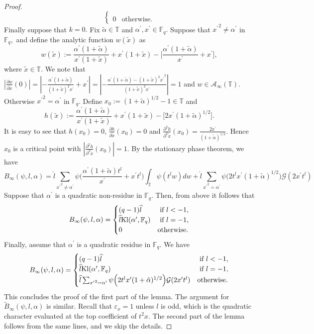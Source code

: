 \documentclass[11pt]{amsart}
\theoremstyle{plain}
\theoremstyle{plain}
\theoremstyle{remark}
\theoremstyle{definition}
\newcommand{\hl}{\widehat l}
\newcommand{\Kl}{\textup{Kl}}
\newcommand{\FF}{\mathbb{F}}
\newcommand{\TT}{\mathbb{T}}
\newcommand{\cA}{\mathcal{A}}
\newcommand{\cG}{\mathcal{G}}
\begin{document}
\begin{proof}
\[\begin{cases}
\\
0   &\text{otherwise.} \end{cases}
\]
Finally suppose that $k=0.$ Fix $\tilde{\alpha}\in \TT $ and $\alpha^{\prime}, x^{\prime} \in \FF_q.$ Suppose that ${x^{\prime}}^2\neq \alpha^{\prime}$ in $\FF_q,$  and  define the analytic function $w(\tilde{x})$ as 
\[
w(\tilde{x}):=\frac{ \alpha^{\prime} (1+\tilde{\alpha})}{x^{\prime}(1+\tilde{x})} + x^{\prime}(1+\tilde{x})- \big[   \frac{ \alpha^{\prime} (1+\tilde{\alpha})}{x^{\prime}} +x^{\prime} \big], 
\]
where $\tilde{x}\in\TT.$ We note that 
$|\frac{\partial w}{\partial \tilde{x}}(0)|=|-\frac{ \alpha^{\prime} (1+\tilde{\alpha})}{(1+\tilde{x})^2x^{\prime}} + x^{\prime}|=|-\frac{ \alpha^{\prime} (1+\tilde{\alpha})-{(1+\tilde{x})^2x^{\prime}}^2}{(1+\tilde{x})^2x^{\prime}} |=1$ and    $w\in \cA_{\infty}(\TT).$ Otherwise ${x^{\prime}}^2= \alpha^{\prime}$ in $\FF_q$. Define $x_0:=(1+\tilde{\alpha})^{1/2}-1\in\TT$ and 
\[
h(\tilde{x}):=\frac{ \alpha^{\prime} (1+\tilde{\alpha})}{x^{\prime}(1+\tilde{x})} + x^{\prime}(1+\tilde{x})- \big[ 2x^{\prime}(1+\tilde{\alpha})^{1/2} \big].
\]
It is easy to see that $h(x_0)=0$, $\frac{\partial{h}}{\partial \tilde{x}}(x_0)=0$ and $\frac{\partial^2{h}}{\partial^2 \tilde{x}}(x_0)=\frac{2x^{\prime}}{(1+\tilde{\alpha})^{1/2}}$. Hence $x_0$ is a critical point with $|\frac{\partial^2{h}}{\partial^2 \tilde{x}}(x_0)|=1.$ By the stationary phase theorem, we have 
\[
B_{\infty}(\psi,l,\alpha)=\hl \sum_{{x^{\prime}}^2\neq \alpha^{\prime}}  \psi\Big(\frac{\alpha^{\prime} (1+\tilde{\alpha})t^l}{x^{\prime}}+x^{\prime}t^{l} \Big)  \int_{\TT} \psi( t^{l}w)dw+\hl\sum_{{x^{\prime}}^2= \alpha^{\prime}}  \psi\Big(2t^{l}x^{\prime}(1+\tilde{\alpha})^{1/2} \Big) \cG(2x^{\prime}t^l) \]
Suppose that $\alpha^{\prime}$ is a quadratic non-residue in $\FF_q.$ Then, from above it follows that
 \[
B_{\infty}(\psi,l,\alpha)=\begin{cases} 
(q-1)\hl &\text{ if } l<-1,
\\
\hl \Kl(\alpha^{\prime},\FF_q) &\text{ if } l=-1,
\\
0   &\text{otherwise.} \end{cases}
\]
Finally, assume that $\alpha^{\prime}$ is a quadratic residue in $\FF_q.$ We have 
 \[
B_{\infty}(\psi,l,\alpha)=\begin{cases} 
(q-1)\hl &\text{ if } l<-1,
\\
\hl \Kl(\alpha^{\prime},\FF_q) &\text{ if } l=-1,
\\
\hl\sum_{{x^{\prime}}^2= \alpha^{\prime}}  \psi\Big(2t^{l}x^{\prime}(1+\tilde{\alpha})^{1/2} \Big) \cG(2x^{\prime}t^l)   &\text{otherwise.} \end{cases}
\]
This concludes the proof of the first part of the lemma. The argument for $\widetilde{B}_{\infty}(\psi,l,\alpha)$ is similar. Recall that  $\varepsilon_{x}=1$ unless $l$ is odd, which is the quadratic character evaluated at the top coefficient of $t^2x$. The second part of the lemma follows from the same lines, and we skip the details.  
\end{proof}
\end{document}
